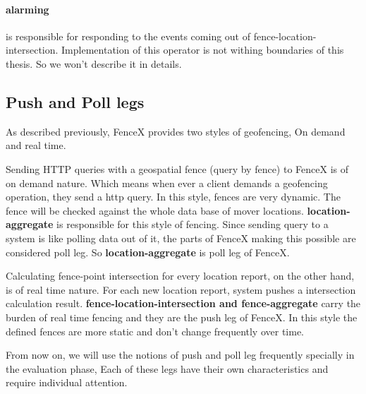 \documentclass[a4]{report}
\begin{document}
    \paragraph{alarming} is responsible for responding to the events coming out of fence-location-intersection.
    Implementation of this operator is not withing boundaries of this thesis.
    So we won't describe it in details.

    \subsection{Push and Poll legs}
    As described previously, FenceX provides two styles of geofencing, On demand and real time.

    Sending HTTP queries with a geospatial fence (query by fence) to FenceX is of on demand nature.
    Which means when ever a client demands a geofencing operation, they send a http query.
    In this style, fences are very dynamic.
    The fence will be checked against the whole data base of mover locations.
    \textbf{location-aggregate} is responsible for this style of fencing.
    Since sending query to a system is like polling data out of it, the parts of FenceX making this possible are
    considered poll leg.
    So \textbf{location-aggregate} is poll leg of FenceX.

    Calculating fence-point intersection for every location report, on the other hand, is of real time nature.
    For each new location report, system pushes a intersection calculation result.
    \textbf{fence-location-intersection and fence-aggregate} carry the burden of real time fencing and they are the
    push leg of FenceX.
    In this style the defined fences are more static and don't change frequently over time.

    From now on, we will use the notions of push and poll leg frequently specially in the evaluation phase, Each of
    these legs have their own characteristics and require individual attention.
\end{document}
